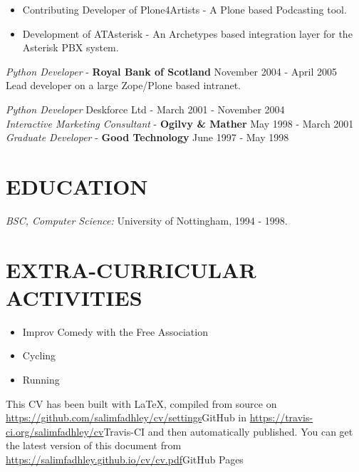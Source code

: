 \documentclass[margin, 10pt]{res} %
\begin{document}
\begin{resume}
        \begin{itemize}
            \item Contributing Developer of Plone4Artists - A Plone based Podcasting tool.
            \item Development of ATAsterisk - An Archetypes based integration layer for the Asterisk PBX system.
        \end{itemize}

        {\sl Python Developer} - \textbf{Royal Bank of Scotland} \hfill November 2004 - April 2005\\

        Lead developer on a large Zope/Plone based intranet.

        {\sl Python Developer} \hfill Deskforce Ltd - March 2001 - November 2004\\

        {\sl Interactive Marketing Consultant} - \textbf{Ogilvy \& Mather} \hfill May 1998 - March 2001\\

        {\sl Graduate Developer} - \textbf{Good Technology} \hfill June 1997 - May 1998\\

        \section{EDUCATION}

        {\sl BSC, Computer Science:} University of Nottingham, 1994 - 1998. \\


        \section{EXTRA-CURRICULAR \\ ACTIVITIES}


        \begin{itemize}
            \item Improv Comedy with the Free Association
            \item Cycling
            \item Running
        \end{itemize}


        {\tiny This CV has been built with \LaTeX, compiled from source on \url{https://github.com/salimfadhley/cv/settings}{GitHub} in \url{https://travis-ci.org/salimfadhley/cv}{Travis-CI} and then
        automatically published. You can get the latest version of this document from \url{https://salimfadhley.github.io/cv/cv.pdf}{GitHub Pages}}

    \end{resume}
\end{document}
